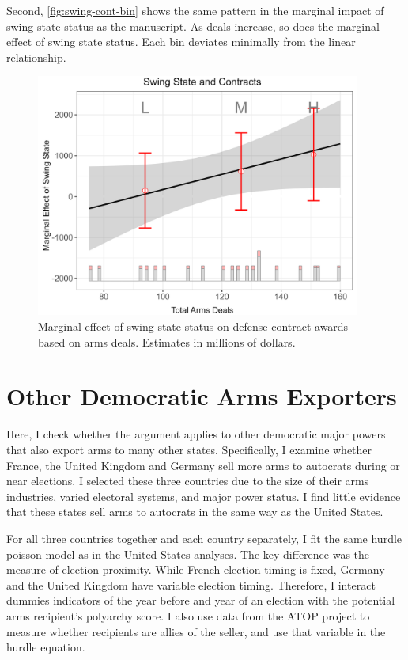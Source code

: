 \documentclass[12pt]{article}
\begin{document}
Second, \autoref{fig:swing-cont-bin} shows the same pattern in the marginal impact of swing state status as the manuscript. 
As deals increase, so does the marginal effect of swing state status. 
Each bin deviates minimally from the linear relationship. 


\begin{figure}[htpb]
	\centering
		\includegraphics[width=0.95\textwidth]{swing-cont-bin.png}
	\caption{Marginal effect of swing state status on defense contract awards based on arms deals. Estimates in millions of dollars.}
	\label{fig:swing-cont-bin}
\end{figure}


\newpage




\section{Other Democratic Arms Exporters}

Here, I check whether the argument applies to other democratic major powers that also export arms to many other states. 
Specifically, I examine whether France, the United Kingdom and Germany sell more arms to autocrats during or near elections.
I selected these three countries due to the size of their arms industries, varied electoral systems, and major power status. 
I find little evidence that these states sell arms to autocrats in the same way as the United States. 


For all three countries together and each country separately, I fit the same hurdle poisson model as in the United States analyses. 
The key difference was the measure of election proximity. 
While French election timing is fixed, Germany and the United Kingdom have variable election timing. 
Therefore, I interact dummies indicators of the year before and year of an election with the potential arms recipient's polyarchy score. 
I also use data from the ATOP project \citep{Leedsetal2002} to measure whether recipients are allies of the seller, and use that variable in the hurdle equation.  
\end{document}
